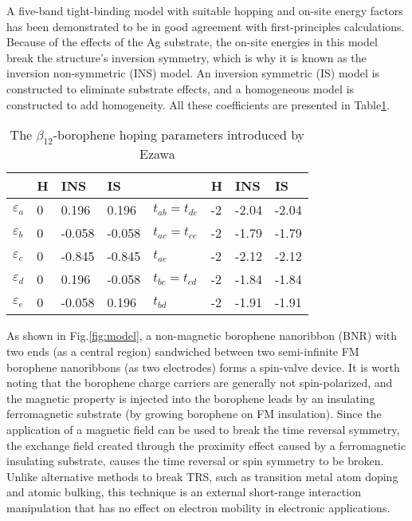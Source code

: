 \documentclass[twoside,twocolumn,9pt]{article}
\begin{document}
A five-band tight-binding model with suitable hopping and on-site energy factors has been demonstrated to be in good agreement with first-principles calculations\cite{feng2017dirac}. Because of the effects of the Ag substrate, the on-site energies in this model break the structure's inversion symmetry, which is why it is known as the inversion non-symmetric (INS) model. An inversion symmetric (IS) model is constructed to eliminate substrate effects, and a homogeneous model is constructed to add homogeneity\cite{ezawa2017triplet}. All these coefficients are presented in Table\ref{tbl:hopping}.

\begin{table}[h]
\small
  \caption{The ${\beta}_{12}$-borophene hoping parameters introduced by Ezawa\cite{ezawa2017triplet}}
  \label{tbl:hopping}
  \begin{tabular*}{0.48\textwidth}{@{\extracolsep{\fill}}llllllll}
    \hline
    & H & INS & IS & & H & INS & IS \\
    \hline
    $\varepsilon_a$& 0 & 0.196 & 0.196 & $t_{ab}=t_{de}$& -2 & -2.04 & -2.04 \\
    $\varepsilon_b$& 0 & -0.058 & -0.058 & $t_{ac}=t_{ce}$& -2 & -1.79 & -1.79 \\
    $\varepsilon_c$& 0 & -0.845 & -0.845 & $t_{ae}$& -2 & -2.12 & -2.12 \\
    $\varepsilon_d$& 0 &  0.196 & -0.058 & $t_{bc}=t_{cd}$& -2 & -1.84 & -1.84 \\
    $\varepsilon_e$& 0 & -0.058 &  0.196 & $t_{bd}$& -2 & -1.91 & -1.91  \\
    \hline
  \end{tabular*}
\end{table}

As shown in Fig.\ref{fig:model}, a non-magnetic borophene nanoribbon (BNR) with two ends (as a central region) sandwiched between two semi-infinite FM borophene nanoribbons (as two electrodes) forms a spin-valve device. It is worth noting that the borophene charge carriers are generally not spin-polarized, and the magnetic property is injected into the borophene leads by an insulating ferromagnetic substrate (by growing borophene on FM insulation). Since the application of a magnetic field can be used to break the time reversal symmetry, the exchange field created through the proximity effect caused by a ferromagnetic insulating substrate, causes the time reversal or spin symmetry to be broken. Unlike alternative methods to break TRS, such as transition metal atom doping\cite{zhang2013stability,chang2013experimental} and atomic bulking\cite{feng2017experimental,yan2021newly}, this technique is an external short-range interaction manipulation that has no effect on electron mobility in electronic applications.
\end{document}
